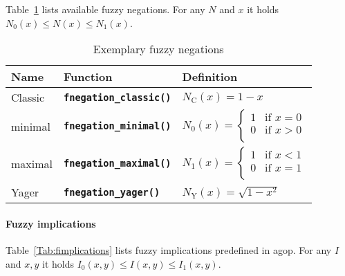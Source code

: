 \documentclass[11pt]{article}\usepackage[]{graphicx}\usepackage[]{color}
\newcommand{\hlkwd}[1]{\textcolor[rgb]{0.737,0.353,0.396}{\textbf{#1}}}%
\newcommand{\package}[1]{\textsf{#1}\xspace}
\newcommand{\Rfunc}[1]{\texttt{\hlkwd{#1}}}
\theoremstyle{remark}
\theoremstyle{definition}
\begin{document}
Table~\ref{Tab:fnegations} lists available fuzzy negations.
For any $N$ and $x$ it holds $N_0(x)\le N(x)\le N_1(x)$.


\begin{table}[htb!]
\caption{\label{Tab:fnegations} Exemplary fuzzy negations}
\centering
\begin{tabular}{llp{7cm}}
\hline
\bf Name & \bf Function & \bf Definition \\
\hline
\hline
Classic & \index{\Rfunc{fnegation\_classic()}}\Rfunc{fnegation\_classic()} & $N_\mathrm{C}(x)=1-x$ \\
minimal & \index{\Rfunc{fnegation\_minimal()}}\Rfunc{fnegation\_minimal()} & $$N_0(x)=\left\{
\begin{array}{ll}
1 & \text{if }x=0\\
0 & \text{if }x>0\\
\end{array}
\right.$$ \\
maximal & \index{\Rfunc{fnegation\_maximal()}}\Rfunc{fnegation\_maximal()} & $$N_1(x)=\left\{
\begin{array}{ll}
1 & \text{if }x<1\\
0 & \text{if }x=1\\
\end{array}
\right.$$ \\
Yager & \index{\Rfunc{fnegation\_yager()}}\Rfunc{fnegation\_yager()} & $N_\mathrm{Y}(x)=\sqrt{1-x^2}$ \\
\hline
\end{tabular}
\end{table}





\paragraph{Fuzzy implications}


Table~\ref{Tab:fimplications} lists fuzzy implications predefined in \package{agop}.
For any $I$ and $x,y$ it holds $I_0(x,y)\le I(x,y)\le I_1(x,y)$.
\end{document}
